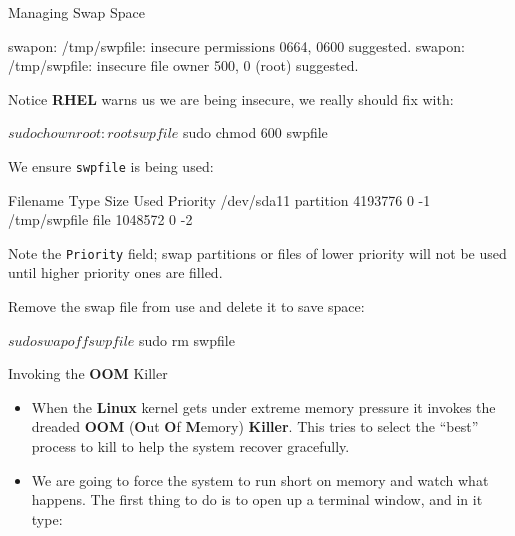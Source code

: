 \begin{Lab}
\begin{exe} {Managing Swap Space}
      \begin{out}[]
swapon: /tmp/swpfile: insecure permissions 0664, 0600 suggested.
swapon: /tmp/swpfile: insecure file owner 500, 0 (root) suggested.
   \end{out}
      \begin{redhatfamilybox}
         Notice \textbf{RHEL} warns us we are being insecure, we really
         should fix with:
         \begin{cmd}
$ sudo chown root:root swpfile
$ sudo chmod 600 swpfile
      \end{cmd}
      \end{redhatfamilybox}
      We ensure \verb?swpfile? is being used:

      \begin{out}[]
Filename                                Type            Size    Used    Priority
/dev/sda11                              partition       4193776 0       -1
/tmp/swpfile                            file            1048572 0       -2
      \end{out}
      Note the \verb?Priority? field; swap partitions or files
      of lower priority will not be used until higher priority
      ones are filled.


      Remove the swap file from use and delete it to save
      space:
      \begin{cmd}
$ sudo swapoff swpfile
$ sudo rm swpfile
   \end{cmd}
   \end{exe}


   \begin{exe} {Invoking the \textbf{OOM} Killer}

      \begin{itemize}
         \item

         When the \textbf{Linux} kernel gets under extreme memory
         pressure it invokes the dreaded \textbf{OOM} (\textbf{O}ut
         \textbf{O}f \textbf{M}emory) \textbf{Killer}. This tries to
         select the ``best'' process to kill to help the
         system recover gracefully.

         \item

         We are going to force the system to run short on memory
         and watch what happens. The first thing to do is to open
         up a terminal window, and in it type:


\end{itemize}
\end{exe}
\end{Lab}

